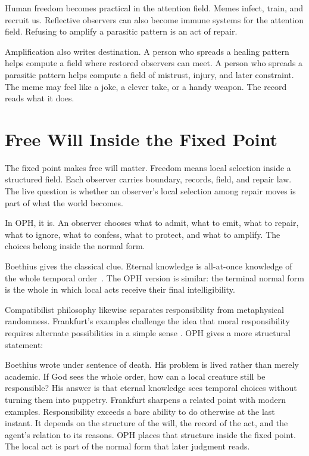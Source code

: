 \documentclass[11pt]{article}
\theoremstyle{remark}
\theoremstyle{plain}
\begin{document}
Human freedom becomes practical in the attention field. Memes infect, train, and
recruit us. Reflective observers can also become immune systems for the
attention field. Refusing to amplify a parasitic pattern is an act of repair.

Amplification also writes destination. A person who spreads a healing pattern
helps compute a field where restored observers can meet. A person who spreads a
parasitic pattern helps compute a field of mistrust, injury, and later
constraint. The meme may feel like a joke, a clever take, or a handy weapon.
The record reads what it does.

\section{Free Will Inside the Fixed Point}

The fixed point makes free will matter. Freedom means local selection inside a
structured field. Each observer carries boundary, records, field, and repair
law. The live question is whether an observer's local selection among repair
moves is part of what the world becomes.

In OPH, it is. An observer chooses what to admit, what to emit, what to repair,
what to ignore, what to confess, what to protect, and what to amplify. The
choices belong inside the normal form.

Boethius gives the classical clue. Eternal knowledge is all-at-once knowledge of
the whole temporal order~\cite{BoethiusConsolation,SEPForeknowledge}. The OPH version is similar: the
terminal normal form is the whole in which local acts receive their final
intelligibility.

Compatibilist philosophy likewise separates responsibility from metaphysical
randomness. Frankfurt's examples challenge the idea that moral responsibility
requires alternate possibilities in a simple sense
\cite{Frankfurt1969,SEPCompatibilism}. OPH gives a more structural statement:

Boethius wrote under sentence of death. His problem is lived rather than merely
academic. If God sees the whole order, how can a local creature still be
responsible? His answer is that eternal knowledge sees temporal choices without
turning them into puppetry. Frankfurt sharpens a related point with modern
examples. Responsibility exceeds a bare ability to do otherwise at the last
instant. It depends on the structure of the will, the record of the
act, and the agent's relation to its reasons. OPH places that structure inside
the fixed point. The local act is part of the normal form that later judgment
reads.
\end{document}
